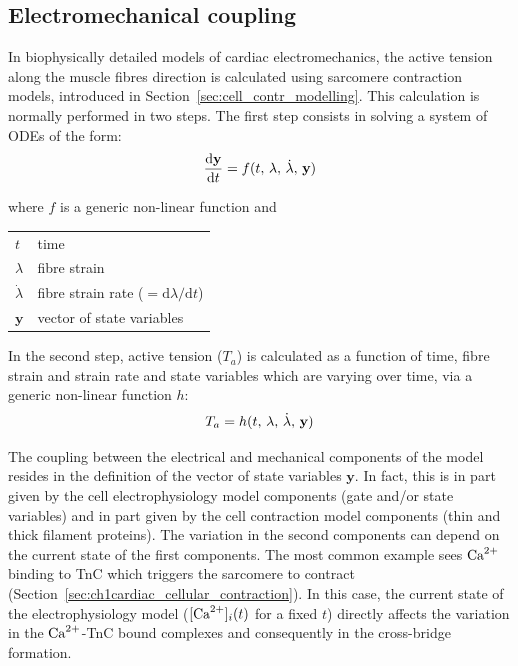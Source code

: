 %
%
%
\subsection{Electromechanical coupling}\label{sec:mathelecmechcoupl}
In biophysically detailed models of cardiac electromechanics, the active tension along the muscle fibres direction is calculated using sarcomere contraction models, introduced in Section~\ref{sec:cell_contr_modelling}. This calculation is normally performed in two steps. The first step consists in solving a system of ODEs of the form:
%
\begin{equation}\label{eq:epmechcoupling}
    \dfrac{\mathrm{d}{\mathbf{y}}}{\mathrm{d}{t}} = f(t,\,\lambda,\,\dot{\lambda},\,\mathbf{y}) 
\end{equation}

\noindent
where $f$ is a generic non-linear function and

\vspace{0.2cm}
\begin{tabular}{ll}
    $t$             & time \\
    $\lambda$       & fibre strain \\
    $\dot{\lambda}$ & fibre strain rate ($=\mathrm{d}\lambda / \mathrm{d}t$) \\
    $\mathbf{y}$    & vector of state variables
\end{tabular}

\vspace{0.2cm}\noindent
In the second step, active tension ($T_a$) is calculated as a function of time, fibre strain and strain rate and state variables which are varying over time, via a generic non-linear function $h$:
%
\begin{equation}\label{eq:activetensioncalc}
    T_a = h(t,\, \lambda,\,\dot{\lambda},\,\mathbf{y}) \\
\end{equation}

\vspace{0.2cm}
The coupling between the electrical and mechanical components of the model resides in the definition of the vector of state variables $\mathbf{y}$. In fact, this is in part given by the cell electrophysiology model components (gate and/or state variables) and in part given by the cell contraction model components (thin and thick filament proteins). The variation in the second components can depend on the current state of the first components. The most common example sees $\textrm{Ca}^{2+}$ binding to TnC which triggers the sarcomere to contract (Section~\ref{sec:ch1cardiac_cellular_contraction}). In this case, the current state of the electrophysiology model ($[\textrm{Ca}^{2+}]_{i}(t)$ for a fixed $t$) directly affects the variation in the $\textrm{Ca}^{2+}$-TnC bound complexes and consequently in the cross-bridge formation.


